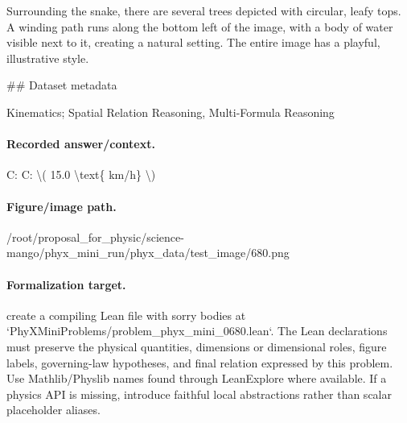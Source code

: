 Surrounding the snake, there are several trees depicted with circular, leafy tops. A winding path runs along the bottom left of the image, with a body of water visible next to it, creating a natural setting. The entire image has a playful, illustrative style.

\#\# Dataset metadata

Kinematics; Spatial Relation Reasoning, Multi-Formula Reasoning

\paragraph{Recorded answer/context.}
C: C: \textbackslash{}( 15.0 \textbackslash{}text\{ km/h\} \textbackslash{})

\paragraph{Figure/image path.}
/root/proposal\_for\_physic/science-mango/phyx\_mini\_run/phyx\_data/test\_image/680.png

\paragraph{Formalization target.}
create a compiling Lean file with sorry bodies at `PhyXMiniProblems/problem\_phyx\_mini\_0680.lean`. The Lean declarations must preserve the physical quantities, dimensions or dimensional roles, figure labels, governing-law hypotheses, and final relation expressed by this problem.
Use Mathlib/Physlib names found through LeanExplore where available. If a physics API is missing, introduce faithful local abstractions rather than scalar placeholder aliases.

